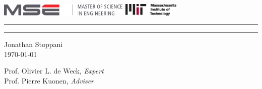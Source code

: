 \begin{titlepage}
\AddToShipoutPicture*{\BackgroundPic}
\thispagestyle{empty}

\vspace*{1mm}
\includegraphics[height=6mm]{images/logo_mse}
\hfill
\includegraphics[height=6mm]{images/logo-mit}
\vspace{5mm}

\newsavebox{\maintitle}
\savebox{\maintitle}{\Huge\justifying\doctitle\par}

\newlength{\titlew}
\settowidth{\titlew}{\usebox{\maintitle}}


\hrule
\vspace{0.2mm}
{\Huge\justifying\doctitle\linebreak\par}
\vspace{-5.5mm}
\hrule
\hspace{0.6mm}\begin{minipage}[t]{0.993\textwidth}
\end{minipage}
\vspace{5mm}
\vfill

Jonathan Stoppani\\[1.5mm]
\today

\vfill

Prof. Olivier L. de Weck, \emph{Expert}\\[2mm]
Prof. Pierre Kuonen, \emph{Adviser}\\[2mm]

\vspace{115mm}
\end{titlepage}
